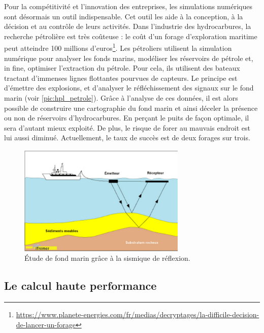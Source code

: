         Pour la compétitivité et l'innovation des entreprises, les simulations numériques sont désormais un outil indispensable. Cet outil les aide à la conception, à la décision et au contrôle de leurs activités. 
        Dans l'industrie des hydrocarbures, la recherche pétrolière est très coûteuse : le coût d'un forage d'exploration maritime peut atteindre 100 millions d'euros\footnote{\url{https://www.planete-energies.com/fr/medias/decryptages/la-difficile-decision-de-lancer-un-forage}}.  Les pétroliers utilisent la simulation numérique pour analyser les fonds marins, modéliser les réservoirs de pétrole et, in fine, optimiser l'extraction du pétrole. Pour cela, ils utilisent des bateaux tractant d'immenses lignes flottantes pourvues de capteurs. Le principe est d'émettre des explosions, et d'analyser le réfléchissement des signaux sur le fond marin (voir \autoref{pic:hpl_petrole}). Grâce à l'analyse de ces données, il est alors possible de construire une cartographie du fond marin et ainsi déceler la présence ou non de réservoirs d'hydrocarbures.  En perçant le puits de façon optimale, il sera d'autant mieux exploité. De plus, le risque de forer au mauvais endroit est lui aussi diminué. Actuellement, le taux de succès est de deux forages sur trois.

        \begin{figure}
            \center
            \includegraphics[width=8cm]{images/hpl_petrole.png}
            \caption{\label{pic:hpl_petrole}Étude de fond marin grâce à la sismique de réflexion.}
        \end{figure}


\subsection{Le calcul haute performance} \label{sec:supercomputer}
        
